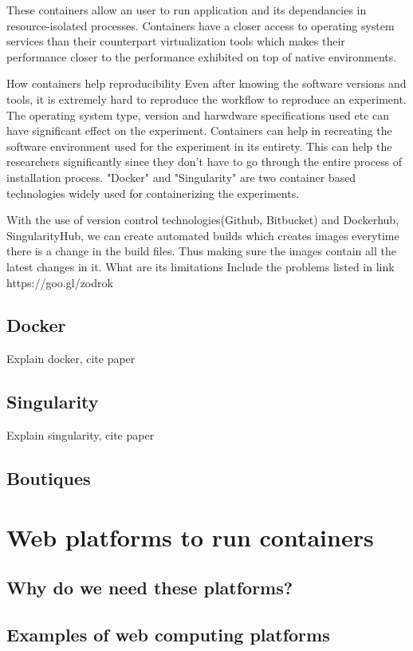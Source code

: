 These containers allow an user to run application and its dependancies in resource-isolated processes. Containers have a closer access to operating system services than their counterpart virtualization tools which makes their performance closer to the performance exhibited on top of native environments\cite{Xavier:2013:PEC:2497369.2497577}.

How containers help reproducibility
Even after knowing the software versions and tools, it is extremely hard to reproduce the workflow to reproduce an experiment. The operating system type, version and harwdware specifications used etc can have significant effect on the experiment. Containers can help in recreating the software environment used for the experiment in its entirety. This can help the researchers significantly since they don't have to go through the entire process of installation process. "Docker" and "Singularity" are two container based technologies widely used for containerizing the experiments.

With the use of version control technologies(Github, Bitbucket) and Dockerhub, SingularityHub, we can create automated builds which creates images everytime there is a change in the build files. Thus making sure the images contain all the latest changes in it. 
What are its limitations
Include the problems listed in link https://goo.gl/zodrok
\subsection{Docker}
Explain docker, cite paper
\subsection{Singularity}
Explain singularity, cite paper
\subsection{Boutiques}

\section{Web platforms to run containers}
\subsection{Why do we need these platforms?}
\subsection{Examples of web computing platforms}
